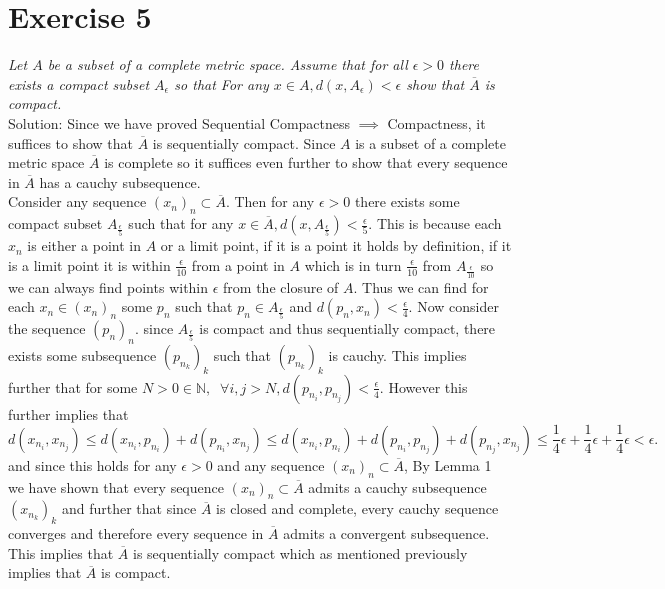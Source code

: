 \documentclass[11pt]{article}
\newcommand{\solution}[1]{{{\textcolor{header}{Solution:} \textcolor{solution}{#1}}}}
\begin{document}
\section{Exercise 5}
\emph{
    Let $A$ be a subset of a complete metric space. Assume that for all
    $\epsilon > 0$ there exists a compact subset $A_\epsilon$ so that For any
    $x \in A, d(x,A_\epsilon) < \epsilon$ show that $\overline{A}$ is compact.\\
}
\solution{
    Since we have proved Sequential Compactness $\implies$ Compactness, it suffices to show that
    $\overline{A}$ is sequentially compact. Since $A$ is a subset of a complete metric space $\overline{A}$ is complete so it suffices
    even further to show that every sequence in $\overline{A}$ has a cauchy subsequence.\\
    Consider any sequence $(x_n)_n \subset \overline{A}$. Then for any $\epsilon > 0$ there exists some compact subset $A_{\frac{\epsilon}{5}}$ such that for any $x \in \overline{A}, d(x,A_{\frac{\epsilon}{5}}) < \frac{\epsilon}{5}$. This is because each $x_n$ is either a point in $A$ or a limit point, if it is a point
    it holds by definition, if it is a limit point it is within $\frac{\epsilon}{10}$ from a point in $A$ which is in turn $\frac{\epsilon}{10}$ from $A_\frac{\epsilon}{10}$ so we can always find points within $\epsilon$ from the closure of $A$.
    Thus we can find for each $x_n \in (x_n)_n$ some $p_n$ such that $p_n \in A_{\frac{\epsilon}{5}}$ and $d(p_n,x_n) < \frac{\epsilon}{4}$.
    Now consider the sequence $(p_n)_n$. since $A_{\frac{\epsilon}{5}}$ is compact and thus sequentially compact, there exists some subsequence
    $(p_{n_k})_k$ such that $(p_{n_k})_k$ is cauchy. This implies further that for some $N > 0 \in \mathbb{N}, \;\; \forall i,j > N, d(p_{n_i},p_{n_j}) < \frac{\epsilon}{4}$.
    However this further implies that 
    \[
        d(x_{n_i}, x_{n_j}) \le d(x_{n_i},p_{n_i}) + d(p_{n_i},x_{n_j}) \le d(x_{n_i},p_{n_i}) + d(p_{n_i},p_{n_j}) + d(p_{n_j},x_{n_j}) \le \frac{1}{4}\epsilon + \frac{1}{4}\epsilon + \frac{1}{4}\epsilon < \epsilon
    .\] 
    and since this holds for any $\epsilon > 0$ and any sequence $(x_n)_n \subset \overline{A}$, By Lemma 1 we have shown that
    every sequence $(x_n)_n \subset \overline{A}$  admits a cauchy subsequence $(x_{n_k})_k$ and further that since  $\overline{A}$ is closed and complete, 
    every cauchy sequence converges and therefore every sequence in $\overline{A}$ admits a convergent subsequence. This implies that $\overline{A}$ is sequentially compact
    which as mentioned previously implies that $\overline{A}$ is compact.
}
\end{document}
